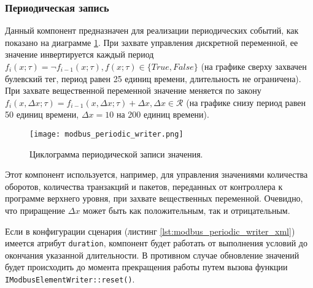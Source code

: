 \subsubsection{Периодическая запись}
Данный компонент предназначен для реализации периодических событий, как показано на диаграмме \ref{fig:modbus_periodic_writer}.
При захвате управления дискретной переменной, ее значение инвертируется каждый период
$f_i(x; \tau) = \lnot f_{i-1}(x; \tau), f(x; \tau) \in \{True, False\}$
(на графике сверху захвачен булевский тег, период равен 25 единиц времени, длительность не ограничена).
При захвате вещественной переменной значение меняется по закону
$f_i(x,\Delta x; \tau) = f_{i-1}(x,\Delta x; \tau) + \Delta x, \Delta x \in \mathcal{R}$
(на графике снизу период равен 50 единиц времени, $\Delta x = 10$ на 200 единиц времени).
\begin{center}
    \begin{figure}[h!]
        \texttt{[image: modbus\_periodic\_writer.png]}
        \caption{Циклограмма периодической записи значения.}\label{fig:modbus_periodic_writer}
    \end{figure}
\end{center}
Этот компонент используется, например, для управления значениями количества оборотов,
количества транзакций и пакетов, переданных от контроллера к программе верхнего уровня,
при захвате вещественных переменной.
Очевидно, что приращение $\Delta x$ может быть как положительным, так и отрицательным.

Если в конфигурации сценария (листинг \ref{lst:modbus_periodic_writer_xml}) имеется атрибут
\texttt{duration}, компонент будет работать от выполнения условий до окончания указанной длительности.
В противном случае обновление значений будет происходить до момента прекращения работы
путем вызова функции \texttt{IModbusElementWriter::reset()}.


